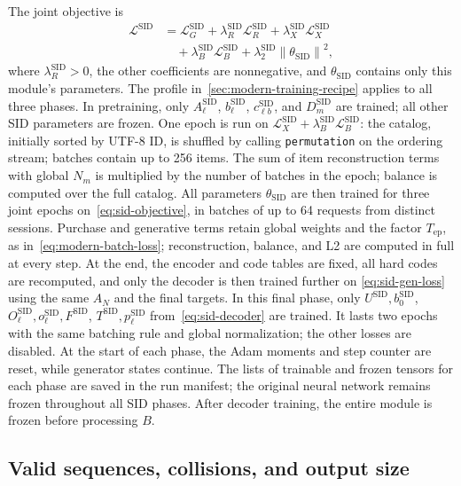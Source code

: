\documentclass[12pt,a4paper]{article}
\newcommand{\code}[1]{{\ttfamily\small\nolinkurl{#1}}}
\newcommand{\norm}[1]{\left\lVert#1\right\rVert}
\theoremstyle{plainru}
\begin{document}
The joint objective is
\begin{align}\label{eq:sid-objective}
 \mathcal L^{\mathrm{SID}}
 &=\mathcal L_G^{\mathrm{SID}}
  +\lambda_R^{\mathrm{SID}}\mathcal L_R^{\mathrm{SID}}
  +\lambda_X^{\mathrm{SID}}\mathcal L_X^{\mathrm{SID}}
  \nonumber\\
 &\quad+\lambda_B^{\mathrm{SID}}\mathcal L_B^{\mathrm{SID}}
  +\lambda_2^{\mathrm{SID}}\norm{\theta_{\mathrm{SID}}}^{2},
\end{align}
where $\lambda_R^{\mathrm{SID}}>0$, the other coefficients are nonnegative,
and $\theta_{\mathrm{SID}}$ contains only this module's parameters.
The profile in~\ref{sec:modern-training-recipe} applies to all three phases.
In pretraining, only $A_\ell^{\mathrm{SID}}$,
$b_\ell^{\mathrm{SID}}$, $c_{\ell b}^{\mathrm{SID}}$, and $D_m^{\mathrm{SID}}$ are trained;
all other SID parameters are frozen. One epoch is run on
$\mathcal L_X^{\mathrm{SID}}+\lambda_B^{\mathrm{SID}}\mathcal L_B^{\mathrm{SID}}$:
the catalog, initially sorted by UTF-8 ID, is shuffled by calling
\code{permutation} on the ordering stream; batches contain up to 256 items.
The sum of item reconstruction terms with global $N_m$
is multiplied by the number of batches in the epoch; balance is computed over the full catalog.
All parameters $\theta_{\mathrm{SID}}$ are then trained for three joint
epochs on~\eqref{eq:sid-objective},
in batches of up to 64 requests from distinct sessions. Purchase and generative
terms retain global weights and the factor $T_{\mathrm{ep}}$,
as in~\eqref{eq:modern-batch-loss}; reconstruction, balance, and L2
are computed in full at every step.
At the end, the encoder and code tables are fixed, all
hard codes are recomputed, and only the decoder is then trained further
on \eqref{eq:sid-gen-loss} using the same $A_N$ and the final targets.
In this final phase, only $U^{\mathrm{SID}},b_0^{\mathrm{SID}}$,
$O_\ell^{\mathrm{SID}},o_\ell^{\mathrm{SID}},F^{\mathrm{SID}}$,
$T^{\mathrm{SID}},p_\ell^{\mathrm{SID}}$ from~\eqref{eq:sid-decoder} are trained.
It lasts two epochs with the same batching rule
and global normalization; the other losses are disabled.
At the start of each phase, the Adam moments and step counter are reset,
while generator states continue. The lists of trainable and frozen
tensors for each phase are saved in the run manifest; the original neural network
remains frozen throughout all SID phases.
After decoder training, the entire module is frozen before processing $B$.

\subsection{Valid sequences, collisions, and output size}
\label{sec:sid-serving}
\end{document}
